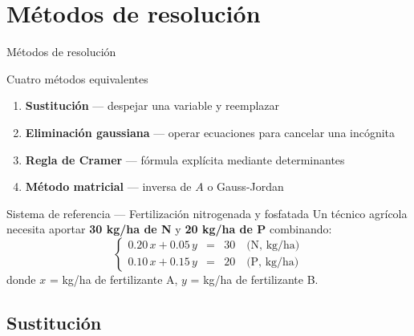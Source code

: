 \documentclass[11pt, aspectratio=169]{beamer}
\begin{document}
	\section{Métodos de resolución}
	
	\begin{frame}{Métodos de resolución}
		\begin{block}{Cuatro métodos equivalentes}
			\begin{enumerate}
				\item \textbf{Sustitución} — despejar una variable y reemplazar
				\item \textbf{Eliminación gaussiana} — operar ecuaciones para cancelar una incógnita
				\item \textbf{Regla de Cramer} — fórmula explícita mediante determinantes
				\item \textbf{Método matricial} — inversa de $A$ o Gauss-Jordan
			\end{enumerate}
		\end{block}
		
		\vspace{0.5em}
		\begin{exampleblock}{Sistema de referencia — Fertilización nitrogenada y fosfatada}
			Un técnico agrícola necesita aportar \textbf{30 kg/ha de N} y \textbf{20 kg/ha de P}
			combinando:
			\[
			\left\{
			\begin{array}{lcl}
				0.20\,x + 0.05\,y & = & 30 \quad \text{(N, kg/ha)} \\[4pt]
				0.10\,x + 0.15\,y & = & 20 \quad \text{(P, kg/ha)}
			\end{array}
			\right.
			\]
			donde $x$ = kg/ha de fertilizante A, \; $y$ = kg/ha de fertilizante B.
		\end{exampleblock}
	\end{frame}
	
	\subsection{Sustitución}
	
\end{document}
